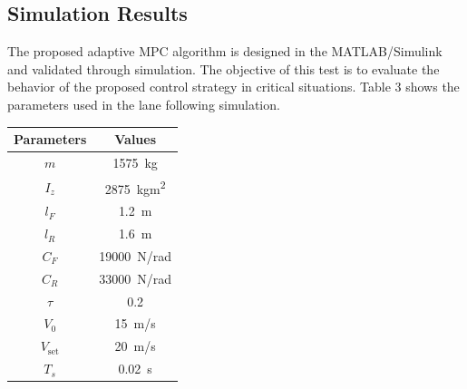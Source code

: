 \documentclass[conference,11pt]{IEEEtran}
\begin{document}
\subsection{Simulation Results}
The proposed adaptive MPC algorithm is designed in the MATLAB/Simulink and validated through simulation. The objective of this test is to evaluate the behavior of the proposed control strategy in critical situations.
Table 3 shows the parameters used in the lane following simulation.
\begin{table}[!h]
	\centering
	\begin{tabular}{|c|c|}
		\hline
		Parameters          & Values      \\
		\hline
		$m$          & \SI{1575}{kg}              \\
		$I_z$         & \SI{2875}{kgm^2}               \\
		$l_F$           & \SI{1.2}{m}               \\
		$l_R$         & \SI{1.6}{m}               \\
		$C_F$          & \SI{19000}{\newton/rad}      \\
		$C_R$           & \SI{33000}{\newton/rad}  \\
		$\tau$             & 0.2                \\
		$V_0$           & \SI{15}{m/s}       \\
		$V_{\text{set}}$          & \SI{20}{m/s}   \\
		$T_s$         & \SI{0.02}{s}          \\
		\hline
	\end{tabular}
\end{table}
\end{document}
